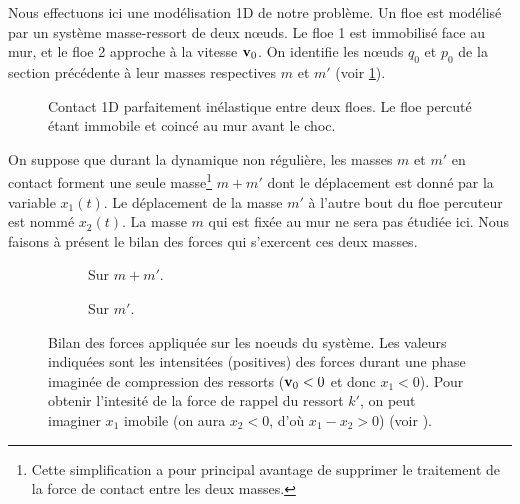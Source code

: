 Nous effectuons ici une modélisation 1D de notre problème. Un floe est modélisé par un système masse-ressort de deux nœuds. Le floe 1 est immobilisé face au mur, et le floe 2 approche à la vitesse $\bm{\mathrm{v}}_0$. On identifie les nœuds $q_0$ et $p_0$ de la section précédente à leur masses respectives $m$ et $m'$ (voir \cref{fig:contact1d}).
\begin{figure}[!h]
    \centering
    \caption{Contact 1D parfaitement inélastique entre deux floes. Le floe percuté étant immobile et coincé au mur avant le choc.}
    \label{fig:contact1d}
\end{figure}

\noindent On suppose que durant la dynamique non régulière, les masses $m$ et $m'$ en contact forment une seule masse\footnote{Cette simplification a pour principal avantage de supprimer le traitement de la force de contact entre les deux masses.}
$m+m'$ dont
le déplacement est donné par la variable $x_1(t)$. Le déplacement de la masse $m'$ à l'autre bout du floe percuteur est nommé
$x_2(t)$. La masse $m$ qui est fixée au mur ne sera pas étudiée ici. Nous faisons à présent le bilan des forces qui
s'exercent ces
deux masses.
\begin{figure}[!h]
     \begin{subfigure}[b]{0.4\textwidth}
         \centering
         \caption{Sur $m+m'$.}
         \label{fig:bilan11}
     \end{subfigure}
     \begin{subfigure}[b]{0.3\textwidth}
         \centering
         \caption{Sur $m'$.}
         \label{fig:bilan12}
     \end{subfigure}
        \caption{Bilan des forces appliquée sur les noeuds du système. Les valeurs indiquées sont les intensitées
            (positives) des forces durant une phase imaginée de compression des ressorts ($\bm{\mathrm{v}}_0 <0$ et donc
            $x_1 <0$). Pour obtenir l'intesité de la force de rappel du ressort $k'$, on peut imaginer $x_1$ imobile
            (on aura $x_2 < 0$, d'où $x_1 - x_2 > 0$) (voir \parencite{homodeling}).}
        \label{fig:bilan}
\end{figure}

